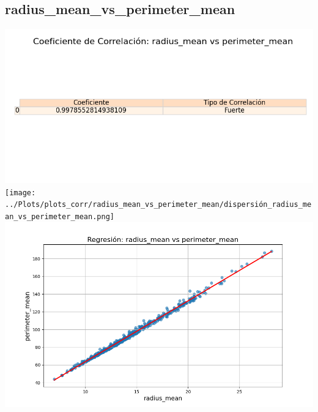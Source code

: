 \documentclass[a4paper, 12pt]{article}
\begin{document}
\subsection{radius\_mean\_vs\_perimeter\_mean}
    \includegraphics[width = \textwidth]{../Plots/plots_corr/radius_mean_vs_perimeter_mean/coeficiente_correlacion_radius_mean_vs_perimeter_mean.png}
    \texttt{[image: ../Plots/plots\_corr/radius\_mean\_vs\_perimeter\_mean/dispersión\_radius\_mean\_vs\_perimeter\_mean.png]}
    \includegraphics[width = \textwidth]{../Plots/plots_corr/radius_mean_vs_perimeter_mean/regresion_radius_mean_vs_perimeter_mean.png}
\end{document}
